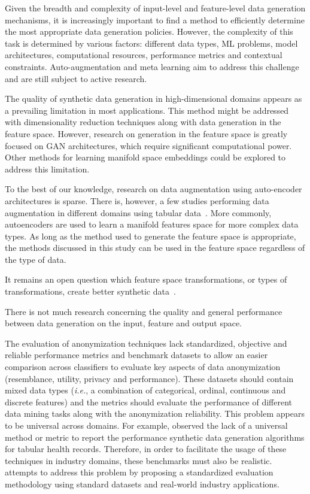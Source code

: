 \documentclass[parskip=full]{scrartcl}
\begin{document}
Given the breadth and complexity of input-level and feature-level data
generation mechanisms, it is increasingly important to find a method to
efficiently determine the most appropriate data generation policies. However,
the complexity of this task is determined by various factors: different data
types, ML problems, model architectures, computational resources, performance
metrics and contextual constraints. Auto-augmentation and meta learning aim to
address this challenge and are still subject to active research.

The quality of synthetic data generation in high-dimensional domains appears
as a prevailing limitation in most applications. This method might be
addressed with dimensionality reduction techniques along with data generation
in the feature space. However, research on generation in the feature space is
greatly focused on GAN architectures, which require significant computational
power. Other methods for learning manifold space embeddings could be explored
to address this limitation.

To the best of our knowledge, research on data augmentation using auto-encoder
architectures is sparse. There is, however, a few studies performing data
augmentation in different domains using tabular data~\cite{delgado2021deep}.
More commonly, autoencoders are used to learn a manifold features space for
more complex data types. As long as the method used to generate the feature
space is appropriate, the methods discussed in this study can be used in the
feature space regardless of the type of data.

It remains an open question which feature space transformations, or types of
transformations, create better synthetic data~\cite{cheung2020modals}.


There is not much research concerning the quality and general performance
between data generation on the input, feature and output space.

The evaluation of anonymization techniques lack standardized, objective and
reliable performance metrics and benchmark datasets to allow an easier
comparison across classifiers to evaluate key aspects of data anonymization
(resemblance, utility, privacy and performance). These datasets should contain
mixed data types (\textit{i.e.}, a combination of categorical, ordinal,
continuous and discrete features) and the metrics should evaluate the
performance of different data mining tasks along with the anonymization
reliability. This problem appears to be universal across domains. For example,
\citet{hernandez2022synthetic} observed the lack of a universal method or
metric to report the performance synthetic data generation algorithms for
tabular health records. Therefore, in order to facilitate the usage of these
techniques in industry domains, these benchmarks must also be
realistic. \citet{rosenblatt2020differentially} attempts to address this
problem by proposing a standardized evaluation methodology using standard
datasets and real-world industry applications.
\end{document}
